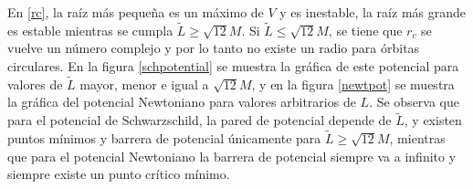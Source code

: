 \documentclass[11pt,twoside,openright,spanish]{report}
\numberwithin{equation}{chapter}
\numberwithin{figure}{chapter}
\numberwithin{table}{chapter}
\begin{document}
En \eqref{rc}, la raíz más pequeña es un máximo de $V$ y es inestable, la raíz más grande es estable mientras se cumpla $\tilde{L}\geq\sqrt{12}M$. Si $\tilde{L}\leq\sqrt{12}M$, se tiene que $r_c$ se vuelve un número complejo y por lo tanto no existe un radio para órbitas circulares. En la figura \ref{schpotential} se muestra la gráfica de este potencial para valores de $\tilde{L}$ mayor, menor e igual a $\sqrt{12}M$, y en la figura \ref{newtpot} se muestra la gráfica del potencial Newtoniano para valores arbitrarios de $L$. Se observa que para el potencial de Schwarzschild, la pared de potencial depende de $\tilde{L}$, y existen puntos mínimos y barrera de potencial únicamente para $\tilde{L}\geq\sqrt{12}M$, mientras que para el potencial Newtoniano la barrera de potencial siempre va a infinito y siempre existe un punto crítico mínimo. 
\end{document}
